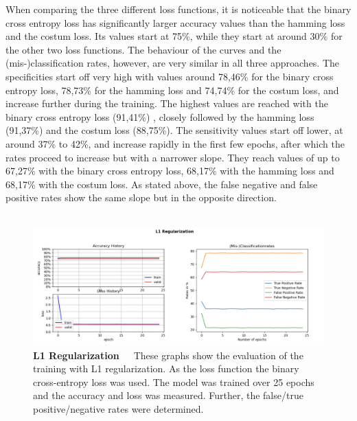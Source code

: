 When comparing the three different loss functions, it is noticeable that the binary cross entropy loss has significantly larger accuracy values than the hamming loss and the costum loss. Its values start at 75\%, while they start at around 30\% for the other two loss functions. The behaviour of the curves and the (mis-)classification rates, however, are very similar in all three approaches. The specificities start off very high with values around 78,46\% for the binary cross entropy loss, 78,73\% for the hamming loss and 74,74\% for the costum loss, and increase further during the training. The highest values are reached with the binary cross entropy loss (91,41\%) , closely followed by the hamming loss (91,37\%) and the costum loss (88,75\%). The sensitivity values start off lower, at around 37\% to 42\%, and increase rapidly in the first few epochs, after which the rates proceed to increase but with a narrower slope. They reach values of up to 67,27\% with the binary cross entropy loss, 68,17\% with the hamming loss and 68,17\% with the costum loss. As stated above, the false negative and false positive rates show the same slope but in the opposite direction. \\
\\
\begin{figure}[h]
	\centering
	\includegraphics[scale=0.37]{Figures/chapter04/multilabel_L1}
	\decoRule
	\caption[L1 Regularization]{\textbf{L1 Regularization}~~~These graphs show the evaluation of the training with L1 regularization. As the loss function the binary cross-entropy loss was used. The model was trained over 25 epochs and the accuracy and loss was measured. Further, the false/true positive/negative rates were determined.}
	\label{fig:MultilabelL1Regularization}
\end{figure}
\\

